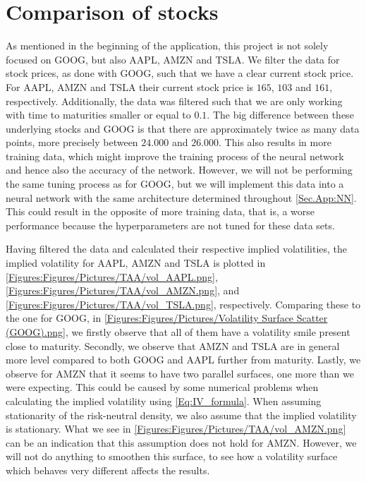 


\section{Comparison of stocks}
As mentioned in the beginning of the application, this project is not solely focused on GOOG, but also AAPL, AMZN and TSLA. We filter the data for stock prices, as done with GOOG, such that we have a clear current stock price. For AAPL, AMZN and TSLA their current stock price is $165$, $103$ and $161$, respectively. Additionally, the data was filtered such that we are only working with time to maturities smaller or equal to $0.1$. The big difference between these underlying stocks and GOOG is that there are approximately twice as many data points, more precisely between $24.000$ and $26.000$. This also results in more training data, which might improve the training process of the neural network and hence also the accuracy of the network. However, we will not be performing the same tuning process as for GOOG, but we will implement this data into a neural network with the same architecture determined throughout \autoref{Sec.App:NN}. This could result in the opposite of more training data, that is, a worse performance because the hyperparameters are not tuned for these data sets.      

Having filtered the data and calculated their respective implied volatilities, the implied volatility for AAPL, AMZN and TSLA is plotted in \autoref{Figures:Figures/Pictures/TAA/vol_AAPL.png}, \autoref{Figures:Figures/Pictures/TAA/vol_AMZN.png}, and \autoref{Figures:Figures/Pictures/TAA/vol_TSLA.png}, respectively. Comparing these to the one for GOOG, in \autoref{Figures:Figures/Pictures/Volatility Surface Scatter (GOOG).png}, we firstly observe that all of them have a volatility smile present close to maturity. Secondly, we observe that AMZN and TSLA are in general more level compared to both GOOG and AAPL further from maturity. Lastly, we observe for AMZN that it seems to have two parallel surfaces, one more than we were expecting. This could be caused by some numerical problems when calculating the implied volatility using \eqref{Eq:IV_formula}. When assuming stationarity of the risk-neutral density, we also assume that the implied volatility is stationary. What we see in \autoref{Figures:Figures/Pictures/TAA/vol_AMZN.png} can be an indication that this assumption does not hold for AMZN. However, we will not do anything to smoothen this surface, to see how a volatility surface which behaves very different affects the results. 

